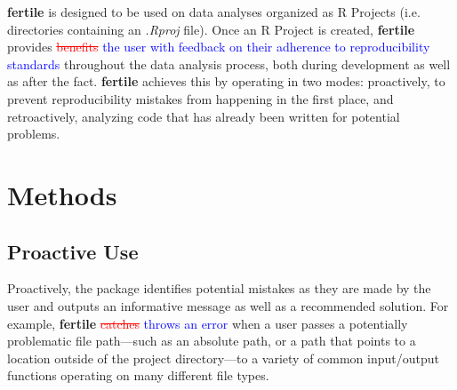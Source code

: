 \documentclass[APA,LATO1COL]{WileyNJD-v2}\usepackage[]{graphicx}\usepackage[]{color}
\newcommand{\R}{\textsf{R}\xspace}
\newcommand{\cmd}[1]{\textit{#1}}
\newcommand{\pkg}[1]{\textbf{#1}}
\begin{document}
\pkg{fertile} is designed to be used on data analyses organized as \R Projects (i.e. directories containing an \cmd{.Rproj} file). Once an \R Project is created, \pkg{fertile} provides \textcolor{red}{\st{benefits}} \textcolor{blue} {the user with feedback on their adherence to reproducibility standards} throughout the data analysis process, both during development as well as after the fact. \pkg{fertile} achieves this by operating in two modes: proactively, to prevent reproducibility mistakes from happening in the first place, and retroactively, analyzing code that has already been written for potential problems.


\section{Methods}\label{sec3}

\subsection{Proactive Use}

Proactively, the package identifies potential mistakes as they are made by the user and outputs an informative message as well as a recommended solution. For example, \pkg{fertile} \textcolor{red}{\st{catches}} \textcolor{blue}{throws an error} when a user passes a potentially problematic file path---such as an absolute path, or a path that points to a location outside of the project directory---to a variety of common input/output functions operating on many different file types.
\end{document}
